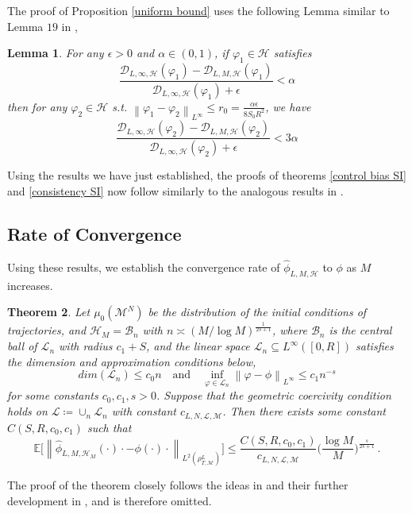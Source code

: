 \documentclass[11pt]{article}
\newtheorem{theorem}{Theorem}[section]
\newtheorem{lemma}[theorem]{Lemma}
\newcommand{\mbf}[1]{\boldsymbol{#1}}
\newcommand{\norm}[1]{\left\| #1 \right\|}
\newcommand{\bX}{\mbf{X}}
\newcommand{\mB}{\mathcal{B}}
\newcommand{\mD}{\mathcal{D}}
\newcommand{\mH}{\mathcal{H}}
\newcommand{\mL}{\mathcal{L}}
\newcommand{\mM}{\mathcal{M}}
\newcommand{\intkernel}{\phi}
\newcommand{\lintkernel}{\widehat{\intkernel}}
\newcommand{\intkernelvar}{\varphi}
\newcommand{\E}{\mathbb{E}}
\newcommand{\probIC}{\mu_0}
\newcommand{\muX}{\probIC(\mM^N)}
\newcommand{\mand}{\quad \text{and} \quad}
\begin{document}
The proof of Proposition \ref{uniform bound} uses the following Lemma similar to Lemma $19$ in \cite{Lu2019a},
\begin{lemma}\label{lemma defect}
For any $\epsilon > 0$ and $\alpha \in (0,1)$, if $\intkernelvar_1 \in \mH$ satisfies
\[
\frac{\mD_{L, \infty, \mH}(\intkernelvar_1) - \mD_{L, M, \mH}(\intkernelvar_1)}{\mD_{L,\infty,\mH}(\intkernelvar_1) + \epsilon} < \alpha
\]
then for any $\intkernelvar_2 \in \mH$ s.t. $\norm{\intkernelvar_1 - \intkernelvar_2}_{L^\infty} \leq r_0 = \frac{\alpha\epsilon}{8S_0R^2}$, we have
\[
\frac{\mD_{L, \infty, \mH}(\intkernelvar_2) - \mD_{L, M, \mH}(\intkernelvar_2)}{\mD_{L, \infty, \mH}(\intkernelvar_2) + \epsilon} < 3\alpha
\]
\end{lemma}
Using the results we have just established, the proofs of theorems \ref{control bias SI} and \ref{consistency SI} now follow similarly to the analogous results in \cite{Lu2019a, Tang2019, miller2020learning}.
%
\subsection{Rate of Convergence}
Using these results, we establish the convergence rate of $\lintkernel_{L, M, \mH}$ to $\intkernel$ as $M$ increases. 		
\begin{theorem}\label{thm:optimal rate of convergence}
Let $\muX$ be the distribution of the initial conditions of trajectories, and $\mH_M = \mB_n$ with $n \asymp ({M}/{\log M})^{\frac{1}{2s + 1}}$, where $\mB_{n}$ is the central ball of $\mL_n$ with radius $c_1 + S$, and the linear space $\mL_n \subseteq L^{\infty}([0,R])$ satisfies the dimension and approximation conditions below,
  \[
    dim(\mL_n) \leq c_0n \mand \inf\limits_{\intkernelvar \in \mathcal{L}_n} \norm{\intkernelvar - \intkernel}_{L^{\infty}} \leq c_1n^{-s}
  \]
  for some constants $c_0, c_1, s > 0$. Suppose that the geometric coercivity condition holds on $\mathcal{L}\coloneqq\cup_n \mL_n$ with constant $c_{L, N, \mathcal{L}, \mM}$.  Then there exists some constant $C(S, R, c_0, c_1)$ such that %
  \begin{equation*}
  \E\Big[\norm{\lintkernel_{L, M, \mH_M}(\cdot)\cdot - \intkernel(\cdot)\cdot}_{L^2(\rho_{T, \mM}^L)}\Big] \le \frac{C(S, R, c_0, c_1)}{c_{L, N, \mathcal{L}, \mM}}\Big(\frac{\log M}{M}\Big)^{\frac{s}{2s + 1}}\,.
  \end{equation*}
 \end{theorem}
The proof of the theorem closely follows the ideas in \cite{Lu2019a} and their further development in \cite{Tang2019,miller2020learning}, and is therefore omitted. 
%
\end{document}
